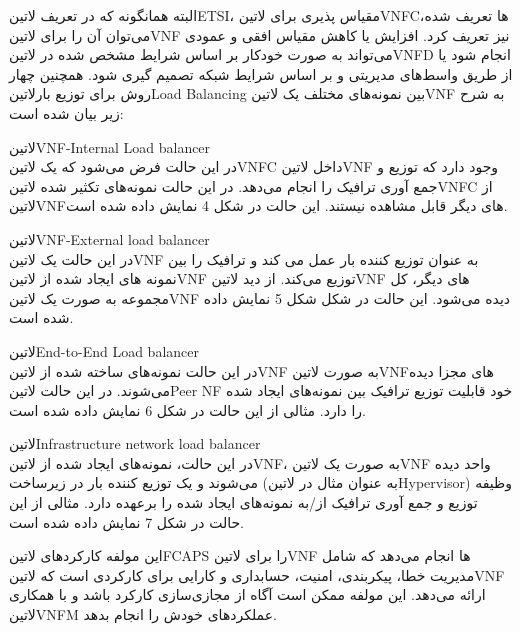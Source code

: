 \documentclass{book}
\begin{document}
البته همانگونه که در تعریف ‌لاتین{ETSI}، مقیاس پذیری برای ‌لاتین{VNFC}ها تعریف شده، می‌توان آن را برای ‌لاتین{VNF} نیز تعریف کرد.
افزایش یا کاهش مقیاس افقی و عمودی می‌تواند به صورت خودکار بر اساس شرایط مشخص شده در ‌لاتین{VNFD} انجام شود یا از طریق واسط‌های مدیریتی و بر اساس شرایط شبکه تصمیم گیری شود.
همچنین چهار روش برای توزیع بار‌لاتین{Load Balancing} بین نمونه‌های مختلف یک ‌لاتین{VNF} به شرح زیر بیان شده است:


 ‌لاتین{VNF-Internal Load balancer}\\
در این حالت فرض می‌شود که یک ‌لاتین{VNFC} داخل ‌لاتین{VNF} وجود دارد که توزیع و جمع آوری ترافیک را انجام می‌دهد.
در این حالت نمونه‌های تکثیر شده ‌لاتین{VNFC} از ‌لاتین{VNF}های دیگر قابل مشاهده نیستند. این حالت در شکل 4 نمایش داده شده است.

 ‌لاتین{VNF-External load balancer}\\
در این حالت یک ‌لاتین{VNF} به عنوان توزیع کننده بار عمل می کند و ترافیک را بین نمونه های ایجاد شده از ‌لاتین{VNF} توزیع می‌کند.
از دید ‌لاتین{VNF} های دیگر، کل مجموعه به صورت یک ‌لاتین{VNF} دیده می‌شود. این حالت در شکل شکل 5 نمایش داده شده است.

 ‌لاتین{End-to-End Load balancer}\\
در این حالت نمونه‌های ساخته شده از ‌لاتین{VNF} به صورت ‌لاتین{VNF}های مجزا دیده می‌شوند.
در این حالت ‌لاتین{Peer NF} خود قابلیت توزیع ترافیک بین نمونه‌های ایجاد شده را دارد. مثالی از این حالت در شکل 6 نمایش داده شده است.

 ‌لاتین{Infrastructure network load balancer}\\
در این حالت، نمونه‌های ایجاد شده از ‌لاتین{VNF}، به صورت یک ‌لاتین{VNF} واحد دیده می‌شوند
و یک توزیع کننده بار در زیرساخت (به عنوان مثال در ‌لاتین{Hypervisor}) وظیفه توزیع و جمع آوری ترافیک از/به نمونه‌های ایجاد شده را برعهده دارد.
مثالی از این حالت در شکل 7 نمایش داده شده است.



این مولفه کارکردهای ‌لاتین{FCAPS}
را برای ‌لاتین{VNF} ها انجام می‌دهد که شامل مدیریت خطا، پیکربندی، امنیت، حسابداری و کارایی برای کارکردی است که ‌لاتین{VNF} ارائه می‌دهد.
این مولفه ممکن است آگاه از مجازی‌سازی کارکرد باشد و با همکاری ‌لاتین{VNFM} عملکردهای خودش را انجام بدهد.
\end{document}
